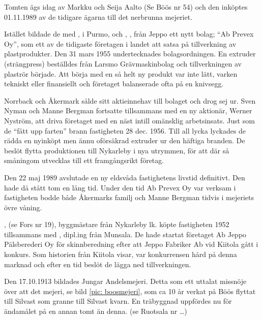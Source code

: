 Tomten ägs idag av Markku och Seija Aalto (Se Böös nr 54) och den inköptes 01.11.1989 av de tidigare ägarna till det nerbrunna mejeriet.



%
Istället bildade de med ,  i Purmo, och , , från Jeppo ett nytt bolag; ``Ab Prevex Oy'', som ett av de tidigaste företagen i landet att satsa på tillverkning av plastprodukter. Den 31 mars 1955 undertecknades bolagsordningen. En extruder (strängpress) beställdes från Larsmo Grävmaskinbolag och  tillverkningen av plaströr började. Att börja med en så helt ny produkt var inte lätt, varken tekniskt eller finansiellt och företaget balanserade ofta på en knivsegg.

Norrback och Åkermark sålde sitt aktieinnehav till bolaget och drog sej ur. Sven Nyman och Manne Bergman fortsatte tillsammans med en ny aktionär, Werner Nyström, att  driva företaget med en näst intill omänsklig arbetsinsats. Just som de ``fått upp farten'' brann fastigheten 28 dec. 1956. Till all lycka lyckades de rädda en nyinköpt men ännu oförsäkrad extruder ur den häftiga branden. De beslöt flytta produktionen till Nykarleby i nya utrymmen, för att där så småningom utvecklas till ett framgångsrikt företag.

Den 22 maj 1989 avslutade en ny eldsvåda fastighetens livstid definitivt. Den hade då stått tom en lång tid. Under den tid Ab Prevex Oy var verksam i fastigheten bodde både Åkermarks familj och Manne Bergman tidvis i mejeriets övre våning.


,  (se Fors nr 19), byggmästare från Nykarleby lk. köpte fastigheten 1952 tillsammans med , dipl.ing från Munsala. De hade startat företaget Ab Jeppo Pälsberederi Oy för skinnberedning efter att Jeppo Fabriker Ab vid Kiitola gått i konkurs. Som historien från Kiitola visar, var konkurrensen hård på denna marknad och efter en tid beslöt de lägga ned tillverkningen.




%
Den 17.10.1913 bildades Jungar Andelsmejeri. Detta som ett uttalat missnöje över att det mejeri, se bild \ref{pic: boosmejeri}, som ca 10 år verkat på Böös flyttat till Silvast som granne till Silvast kvarn. En träbyggnad uppfördes nu för ändamålet på en annan tomt än denna. (se Ruotsala nr …)

